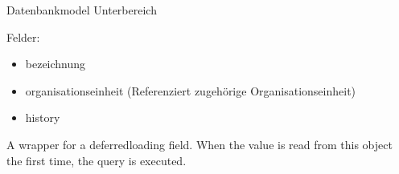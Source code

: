 \documentclass[letterpaper,10pt,english]{sphinxmanual}
\begin{document}
\begin{fulllineitems}
\label{\detokenize{masterCodeDoc:aemter.models.Unterbereich}}
Datenbankmodel Unterbereich

Felder:
\begin{itemize}
\item {} 
bezeichnung

\item {} 
organisationseinheit (Referenziert zugehörige Organisationseinheit)

\item {} 
history

\end{itemize}

\begin{fulllineitems}
\label{\detokenize{masterCodeDoc:aemter.models.Unterbereich.DoesNotExist}}
\end{fulllineitems}


\begin{fulllineitems}
\label{\detokenize{masterCodeDoc:aemter.models.Unterbereich.MultipleObjectsReturned}}
\end{fulllineitems}


\begin{fulllineitems}
\label{\detokenize{masterCodeDoc:aemter.models.Unterbereich.bezeichnung}}
A wrapper for a deferred\sphinxhyphen{}loading field. When the value is read from this
object the first time, the query is executed.

\end{fulllineitems}



\end{fulllineitems}
\end{document}
